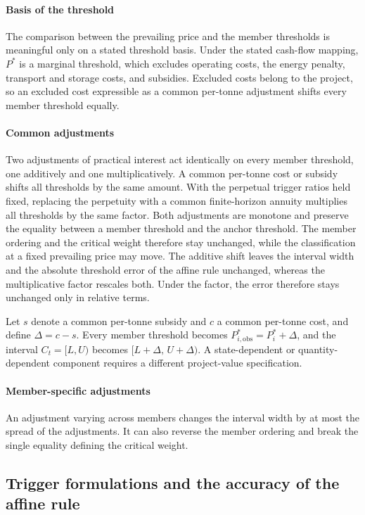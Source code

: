 \documentclass[5p,times,authoryear]{elsarticle}
\theoremstyle{plain}
\begin{document}
\paragraph{Basis of the threshold} The comparison between the prevailing price and the member thresholds is meaningful only on a stated threshold basis. Under the stated cash-flow mapping, $P^{*}$ is a marginal threshold, which excludes operating costs, the energy penalty, transport and storage costs, and subsidies. Excluded costs belong to the project, so an excluded cost expressible as a common per-tonne adjustment shifts every member threshold equally.

\paragraph{Common adjustments} Two adjustments of practical interest act identically on every member threshold, one additively and one multiplicatively. A common per-tonne cost or subsidy shifts all thresholds by the same amount. With the perpetual trigger ratios held fixed, replacing the perpetuity with a common finite-horizon annuity multiplies all thresholds by the same factor. Both adjustments are monotone and preserve the equality between a member threshold and the anchor threshold. The member ordering and the critical weight therefore stay unchanged, while the classification at a fixed prevailing price may move. The additive shift leaves the interval width and the absolute threshold error of the affine rule unchanged, whereas the multiplicative factor rescales both. Under the factor, the error therefore stays unchanged only in relative terms.

Let $s$ denote a common per-tonne subsidy and $c$ a common per-tonne cost, and define $\Delta=c-s$. Every member threshold becomes $P^{*}_{i,\mathrm{obs}}=P^{*}_{i}+\Delta$, and the interval $C_t=[L,U)$ becomes $[L+\Delta,\,U+\Delta)$. A state-dependent or quantity-dependent component requires a different project-value specification.

\paragraph{Member-specific adjustments} An adjustment varying across members changes the interval width by at most the spread of the adjustments. It can also reverse the member ordering and break the single equality defining the critical weight.

\subsection{Trigger formulations and the accuracy of the affine rule}
\end{document}
